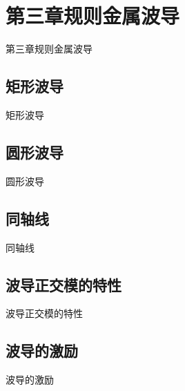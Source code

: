 \section{第三章\quad 规则金属波导}
\begin{frame}{第三章\quad 规则金属波导}

\end{frame}

\subsection{矩形波导}
\begin{frame}{矩形波导}

\end{frame}

\subsection{圆形波导}
\begin{frame}{圆形波导}

\end{frame}

\subsection{同轴线}
\begin{frame}{同轴线}

\end{frame}

\subsection{波导正交模的特性}
\begin{frame}{波导正交模的特性}

\end{frame}

\subsection{波导的激励}
\begin{frame}{波导的激励}

\end{frame}
